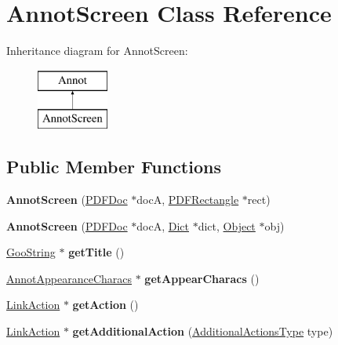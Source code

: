 \hypertarget{class_annot_screen}{}\section{Annot\+Screen Class Reference}
\label{class_annot_screen}
Inheritance diagram for Annot\+Screen\+:\begin{figure}[H]
\begin{center}
\leavevmode
\includegraphics[height=2.000000cm]{class_annot_screen}
\end{center}
\end{figure}
\subsection*{Public Member Functions}
\begin{DoxyCompactItemize}
\item 
\mbox{\label{class_annot_screen_abf01c6b3531a4188c5b4e2703af1f8a0}} 
{\bfseries Annot\+Screen} (\hyperlink{class_p_d_f_doc}{P\+D\+F\+Doc} $\ast$docA, \hyperlink{class_p_d_f_rectangle}{P\+D\+F\+Rectangle} $\ast$rect)
\item 
\mbox{\label{class_annot_screen_a146e3a23cfa1ae56600e0f64d0f0c455}} 
{\bfseries Annot\+Screen} (\hyperlink{class_p_d_f_doc}{P\+D\+F\+Doc} $\ast$docA, \hyperlink{class_dict}{Dict} $\ast$dict, \hyperlink{class_object}{Object} $\ast$obj)
\item 
\mbox{\label{class_annot_screen_a0d0fc25104a1af29201723712d25427b}} 
\hyperlink{class_goo_string}{Goo\+String} $\ast$ {\bfseries get\+Title} ()
\item 
\mbox{\label{class_annot_screen_a9bad057d350777d7802ca59248dc4ac3}} 
\hyperlink{class_annot_appearance_characs}{Annot\+Appearance\+Characs} $\ast$ {\bfseries get\+Appear\+Characs} ()
\item 
\mbox{\label{class_annot_screen_a0f96fbe06572e948bf7ae172a12c6e06}} 
\hyperlink{class_link_action}{Link\+Action} $\ast$ {\bfseries get\+Action} ()
\item 
\mbox{\label{class_annot_screen_a9f383ef1016f4e494fd0fe1d836db478}} 
\hyperlink{class_link_action}{Link\+Action} $\ast$ {\bfseries get\+Additional\+Action} (\hyperlink{class_annot_aee99d73d7beb3a7aef74f6bc68cc797f}{Additional\+Actions\+Type} type)
\end{DoxyCompactItemize}
